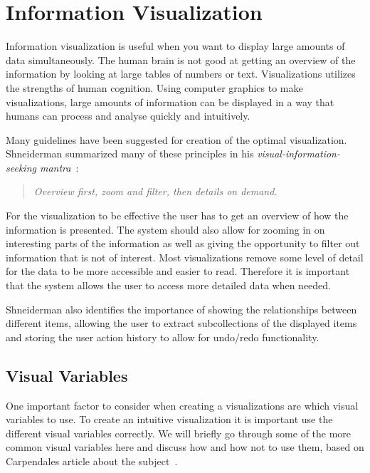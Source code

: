 \section{Information Visualization}
Information visualization is useful when you want to display large amounts of data simultaneously. The human brain is not good at getting an overview of the information by looking at large tables of numbers or text. Visualizations utilizes the strengths of human cognition. Using computer graphics to make visualizations, large amounts of information can be displayed in a way that humans can process and analyse quickly and intuitively.

Many guidelines have been suggested for creation of the optimal visualization. Shneiderman summarized many of these principles in his \emph{visual-information-seeking mantra}~\cite{shneiderman}:
\begin{quote}
\textit{Overview first, zoom and filter, then details on demand.}
\end{quote}

For the visualization to be effective the user has to get an overview of how the information is presented. The system should also allow for zooming in on interesting parts of the information as well as giving the opportunity to filter out information that is not of interest. Most visualizations remove some level of detail for the data to be more accessible and easier to read. Therefore it is important that the system allows the user to access more detailed data when needed.

Shneiderman also identifies the importance of showing the relationships between different items, allowing the user to extract subcollections of the displayed items and storing the user action history to allow for undo/redo functionality.

\subsection{Visual Variables}
One important factor to consider when creating a visualizations are which visual variables to use. To create an intuitive visualization it is important use the different visual variables correctly. We will briefly go through some of the more common visual variables here and discuss how and how not to use them, based on Carpendales article about the subject~\cite{carpendale}.

